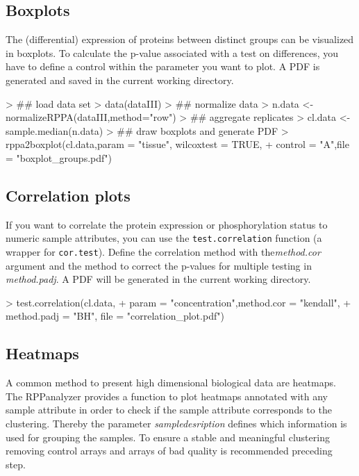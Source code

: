 \documentclass[12pt]{article}
\newcommand{\Rfunction}[1]{{\texttt{#1}}}
\newcommand{\Rfunarg}[1]{{\textit{#1}}}
\begin{document}
\subsection{Boxplots}

The (differential) expression of proteins between distinct groups can be visualized in boxplots.
To calculate the p-value associated with a test on differences, you have to define a control within the parameter you want to plot. A PDF is generated and saved in the current working directory.

\begin{Schunk}
\begin{Sinput}
> ## load data set
> data(dataIII)
> ## normalize data
> n.data <- normalizeRPPA(dataIII,method="row")
> ## aggregate replicates
> cl.data <- sample.median(n.data)
> ## draw boxplots and generate PDF
> rppa2boxplot(cl.data,param = "tissue", wilcoxtest = TRUE,
+             control = "A",file = "boxplot_groups.pdf")
\end{Sinput}
\end{Schunk}

\subsection{Correlation plots}

If you want to correlate the protein expression or phosphorylation status to numeric sample attributes,
you can use the \Rfunction{test.correlation} function (a wrapper for \Rfunction{cor.test}). Define the correlation method with the\Rfunarg{method.cor} argument and the method to correct the p-values for multiple testing in \Rfunarg{method.padj}. A PDF will be generated in the current working directory.

\begin{Schunk}
\begin{Sinput}
> test.correlation(cl.data,
+             param = "concentration",method.cor = "kendall",
+             method.padj = "BH", file = "correlation_plot.pdf")
\end{Sinput}
\end{Schunk}

\subsection{Heatmaps}

A common method to present high dimensional biological data are heatmaps. The RPPanalyzer provides a function to plot heatmaps annotated with any sample attribute in order to check if the sample attribute corresponds to the clustering. Thereby the parameter \Rfunarg{sampledesription} defines which information is used for grouping the samples. To ensure a stable and meaningful clustering removing control arrays and arrays of bad quality is recommended preceding step.
\end{document}
